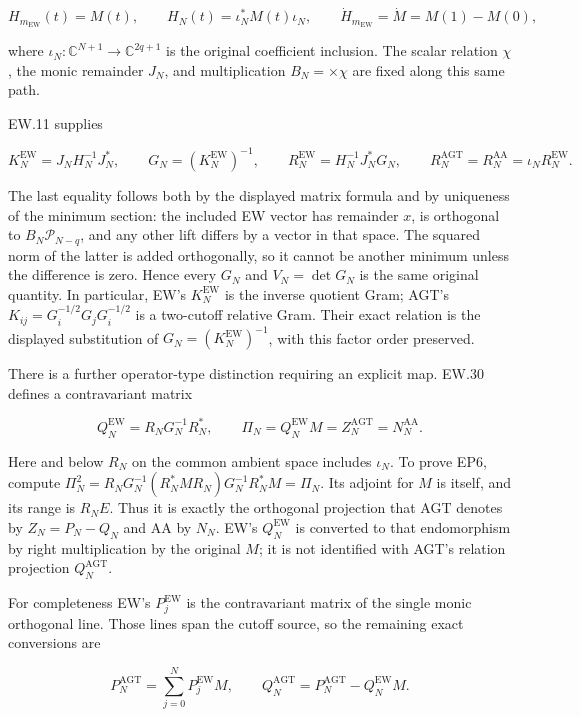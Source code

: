 \[
H_{m_{\mathrm{EW}}}(t)=M(t),\qquad
H_N(t)=\iota_N^*M(t)\iota_N,
\qquad \dot H_{m_{\mathrm{EW}}}=\dot M=M(1)-M(0),
\tag{EP4}
\]

where \(\iota_N:\mathbb C^{N+1}\to\mathbb C^{2q+1}\) is the original coefficient inclusion. The scalar relation \(\chi\), the monic remainder \(J_N\), and multiplication \(B_N=\times\chi\) are fixed along this same path.

EW.11 supplies

\[
K_N^{\mathrm{EW}}=J_NH_N^{-1}J_N^*,\qquad
G_N=(K_N^{\mathrm{EW}})^{-1},\qquad
R_N^{\mathrm{EW}}=H_N^{-1}J_N^*G_N,
\qquad R_N^{\mathrm{AGT}}=R_N^{\mathrm{AA}}=\iota_NR_N^{\mathrm{EW}}.
\tag{EP5}
\]

The last equality follows both by the displayed matrix formula and by uniqueness of the minimum section: the included EW vector has remainder \(x\), is orthogonal to \(B_N\mathcal P_{N-q}\), and any other lift differs by a vector in that space. The squared norm of the latter is added orthogonally, so it cannot be another minimum unless the difference is zero. Hence every \(G_N\) and \(V_N=\det G_N\) is the same original quantity. In particular, EW's \(K_N^{\mathrm{EW}}\) is the inverse quotient Gram; AGT's \(K_{ij}=G_i^{-1/2}G_jG_i^{-1/2}\) is a two-cutoff relative Gram. Their exact relation is the displayed substitution of \(G_N=(K_N^{\mathrm{EW}})^{-1}\), with this factor order preserved.

There is a further operator-type distinction requiring an explicit map. EW.30 defines a contravariant matrix

\[
Q_N^{\mathrm{EW}}
=R_NG_N^{-1}R_N^*,\qquad
\Pi_N=Q_N^{\mathrm{EW}}M
=Z_N^{\mathrm{AGT}}=N_N^{\mathrm{AA}}.
\tag{EP6}
\]

Here and below \(R_N\) on the common ambient space includes \(\iota_N\). To prove EP6, compute \(\Pi_N^2=R_NG_N^{-1}(R_N^*MR_N)G_N^{-1}R_N^*M=\Pi_N\). Its adjoint for \(M\) is itself, and its range is \(R_NE\). Thus it is exactly the orthogonal projection that AGT denotes by \(Z_N=P_N-Q_N\) and AA by \(N_N\). EW's \(Q_N^{\mathrm{EW}}\) is converted to that endomorphism by right multiplication by the original \(M\); it is not identified with AGT's relation projection \(Q_N^{\mathrm{AGT}}\).

For completeness EW's \(P_j^{\mathrm{EW}}\) is the contravariant matrix of the single monic orthogonal line. Those lines span the cutoff source, so the remaining exact conversions are

\[
P_N^{\mathrm{AGT}}=\sum_{j=0}^N P_j^{\mathrm{EW}}M,
\qquad
Q_N^{\mathrm{AGT}}=P_N^{\mathrm{AGT}}-Q_N^{\mathrm{EW}}M.
\tag{EP7}
\]

